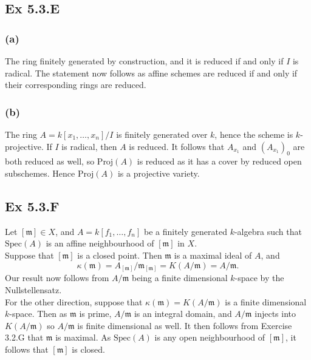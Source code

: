 \documentclass{article}
\theoremstyle{definition}
\newcommand{\Spec}{\text{Spec}}
\newcommand{\Proj}{\text{Proj}}
\begin{document}
\subsection*{Ex 5.3.E}

\subsubsection*{(a)}

The ring finitely generated by construction, and it is reduced if and only if
$I$ is radical. The statement now follows as affine schemes are reduced if and
only if their corresponding rings are reduced.

\subsubsection*{(b)}

The ring $A = k[x_1, \ldots, x_n]/I$ is finitely generated over $k$, hence the
scheme is $k$-projective. If  $I$ is radical, then $A$ is reduced. It follows
that $A_{x_1}$ and $(A_{x_1})_0$ are both reduced as well, so $\Proj(A)$ is
reduced as it has a cover by reduced open subschemes. Hence $\Proj(A)$ is a
projective variety.

\subsection*{Ex 5.3.F}

Let $[\mathfrak{m}] \in X$, and $A = k[f_1, \ldots, f_n]$ be a finitely
generated $k$-algebra such that $\Spec(A)$ is an affine neighbourhood of
$[\mathfrak{m}]$ in $X$. \\

Suppose that $[\mathfrak{m}]$ is a closed point. Then $\mathfrak{m}$ is 
a maximal ideal of $A$, and
\[
	\kappa(\mathfrak{m}) 
	= 
	A_{[\mathfrak{m}]}/\mathfrak{m}_{[\mathfrak{m}]}
	= 
	K(A/\mathfrak{m})
	=
	A/\mathfrak{m}.
\]
Our result now follows from $A/\mathfrak{m}$ being a finite dimensional
$k$-space by the Nullstellensatz. \\

For the other direction, suppose that $\kappa(\mathfrak{m}) =
K(A/\mathfrak{m})$ is a finite dimensional $k$-space. Then as $\mathfrak{m}$ is
prime, $A/\mathfrak{m}$ is an integral domain, and $A/\mathfrak{m}$ injects
into $K(A/\mathfrak{m})$ so $A/\mathfrak{m}$ is finite dimensional as well. It
then follows from Exercise 3.2.G that $\mathfrak{m}$ is maximal. As $\Spec(A)$
is any open neighbourhood of $[\mathfrak{m}]$, it follows that $[\mathfrak{m}]$
is closed. \\
\end{document}
